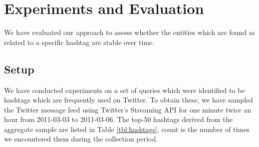 \documentclass{llncs}
\begin{document}
\section{Experiments and Evaluation}
\label{sect:eval}

We have evaluated our approach to assess whether the entities which are found as related to a specific hashtag are stable over time.

\subsection{Setup}

We have conducted experiments on a set of queries which were identified to be hashtags which are frequently used on Twitter.
To obtain these, we have sampled the Twitter message feed using Twitter's
Streaming API for one minute twice an hour from 2011-03-03 to 2011-03-06. The
top-50 hashtags derived from the aggregate sample are listed in Table
\ref{tbl:hashtags}, count is the number of times we encountered them during the
collection period.
\end{document}
